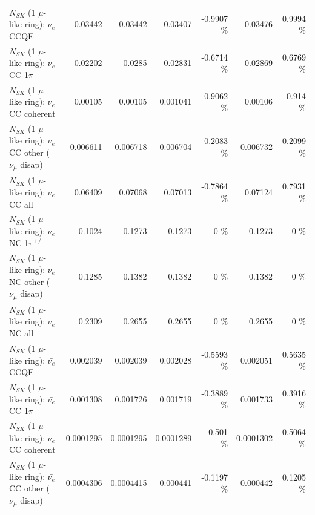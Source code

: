 \begin{table}
\begin{tabular}{| l | r | r | r  r | r  r |}
\hline
\hline
\hline
                                      $N_{SK}$ (1 $\mu$-like ring): $\nu_e$ CCQE &         0.03442 &         0.03442 &         0.03407 &  -0.9907 \%  &         0.03476 &   0.9994 \%  \\ 
                                 $N_{SK}$ (1 $\mu$-like ring): $\nu_e$ CC 1$\pi$ &         0.02202 &          0.0285 &         0.02831 &  -0.6714 \%  &         0.02869 &   0.6769 \%  \\ 
                               $N_{SK}$ (1 $\mu$-like ring): $\nu_e$ CC coherent &         0.00105 &         0.00105 &        0.001041 &  -0.9062 \%  &         0.00106 &    0.914 \%  \\ 
                $N_{SK}$ (1 $\mu$-like ring): $\nu_e$ CC other ($\nu_\mu$ disap) &        0.006611 &        0.006718 &        0.006704 &  -0.2083 \%  &        0.006732 &   0.2099 \%  \\ 
                                  $N_{SK}$ (1 $\mu$-like ring): $\nu_{e}$ CC all &         0.06409 &         0.07068 &         0.07013 &  -0.7864 \%  &         0.07124 &   0.7931 \%  \\ 
\hline
                           $N_{SK}$ (1 $\mu$-like ring): $\nu_e$ NC 1$\pi^{+/-}$ &          0.1024 &          0.1273 &          0.1273 &        0 \%  &          0.1273 &        0 \%  \\ 
                $N_{SK}$ (1 $\mu$-like ring): $\nu_e$ NC other ($\nu_\mu$ disap) &          0.1285 &          0.1382 &          0.1382 &        0 \%  &          0.1382 &        0 \%  \\ 
                                  $N_{SK}$ (1 $\mu$-like ring): $\nu_{e}$ NC all &          0.2309 &          0.2655 &          0.2655 &        0 \%  &          0.2655 &        0 \%  \\ 
\hline
\hline
\hline
                                $N_{SK}$ (1 $\mu$-like ring): $\bar{\nu_e}$ CCQE &        0.002039 &        0.002039 &        0.002028 &  -0.5593 \%  &        0.002051 &   0.5635 \%  \\ 
                           $N_{SK}$ (1 $\mu$-like ring): $\bar{\nu_e}$ CC 1$\pi$ &        0.001308 &        0.001726 &        0.001719 &  -0.3889 \%  &        0.001733 &   0.3916 \%  \\ 
                         $N_{SK}$ (1 $\mu$-like ring): $\bar{\nu_e}$ CC coherent &       0.0001295 &       0.0001295 &       0.0001289 &   -0.501 \%  &       0.0001302 &   0.5064 \%  \\ 
          $N_{SK}$ (1 $\mu$-like ring): $\bar{\nu_e}$ CC other ($\nu_\mu$ disap) &       0.0004306 &       0.0004415 &        0.000441 &  -0.1197 \%  &        0.000442 &   0.1205 \%  \\ 

\end{tabular}
\end{table}
